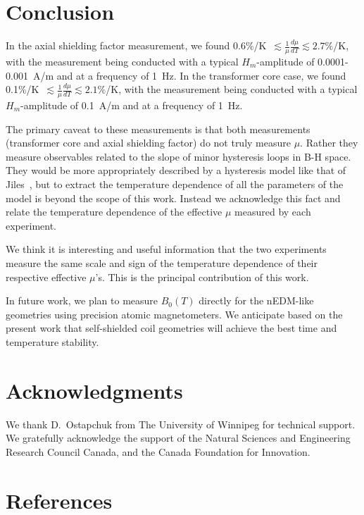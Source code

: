 \documentclass[review]{elsarticle}
\begin{document}
\section{Conclusion}

In the axial shielding factor measurement, we found
0.6\%/K~$\lesssim\frac{1}{\mu}\frac{d\mu}{dT}\lesssim 2.7\%$/K, with
the measurement being conducted with a typical $H_m$-amplitude of
0.0001-0.001~A/m and at a frequency of 1~Hz.  In the transformer core
case, we found 0.1\%/K~$\lesssim\frac{1}{\mu}\frac{d\mu}{dT}\lesssim
2.1\%$/K, with the measurement being conducted with a typical
$H_m$-amplitude of 0.1~A/m and at a frequency of 1~Hz.

The primary caveat to these measurements is that both measurements
(transformer core and axial shielding factor) do not truly measure
$\mu$.  Rather they measure observables related to the slope of minor
hysteresis loops in B-H space.  They would be more appropriately
described by a hysteresis model like that of Jiles~\cite{bib:jiles},
but to extract the temperature dependence of all the parameters of the
model is beyond the scope of this work.  Instead we acknowledge this
fact and relate the temperature dependence of the effective $\mu$
measured by each experiment.

We think it is interesting and useful information that the two
experiments measure the same scale and sign of the temperature
dependence of their respective effective $\mu$'s.  This is the
principal contribution of this work.

In future work, we plan to measure $B_0(T)$ directly for the nEDM-like
geometries using precision atomic magnetometers.  We anticipate based
on the present work that self-shielded coil geometries will achieve
the best time and temperature stability.



\section{Acknowledgments}

We thank D.~Ostapchuk from The University of Winnipeg for technical
support.  We gratefully acknowledge the support of the Natural
Sciences and Engineering Research Council Canada, and the Canada
Foundation for Innovation.


\section*{References}
\end{document}
